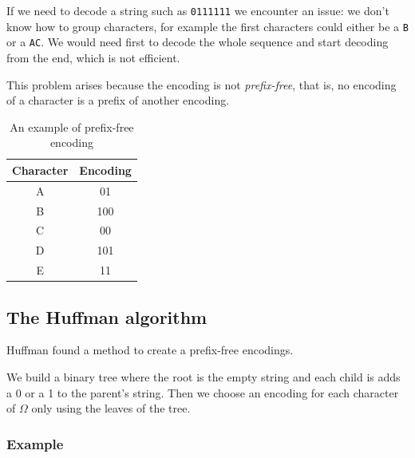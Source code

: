 \documentclass[12pt]{extarticle}
\begin{document}
If we need to decode a string such as \texttt{0111111} we encounter an issue: we don't know how to group characters, for example the first characters could either be a \texttt{B} or a \texttt{AC}.
We would need first to decode the whole sequence and start decoding from the end, which is not efficient.

This problem arises because the encoding is not \textit{prefix-free}, that is, no encoding of a character is a prefix of another encoding.

\begin{table}[H]
    \centering
    \begin{tabular}{ |c|c| }
        \hline
        \textbf{Character} & \textbf{Encoding} \\
        \hline
        A                  & 01                \\
        B                  & 100               \\
        C                  & 00                \\
        D                  & 101               \\
        E                  & 11                \\
        \hline
    \end{tabular}

    \caption{An example of prefix-free encoding}
    \label{tab:prefix_free_encoding}
\end{table}

\subsection{The Huffman algorithm}

Huffman found a method to create a prefix-free encodings.

We build a binary tree where the root is the empty string and each child is adds a 0 or a 1 to the parent's string.
Then we choose an encoding for each character of $\Omega$ only using the leaves of the tree.

\subsubsection{Example}
\end{document}
